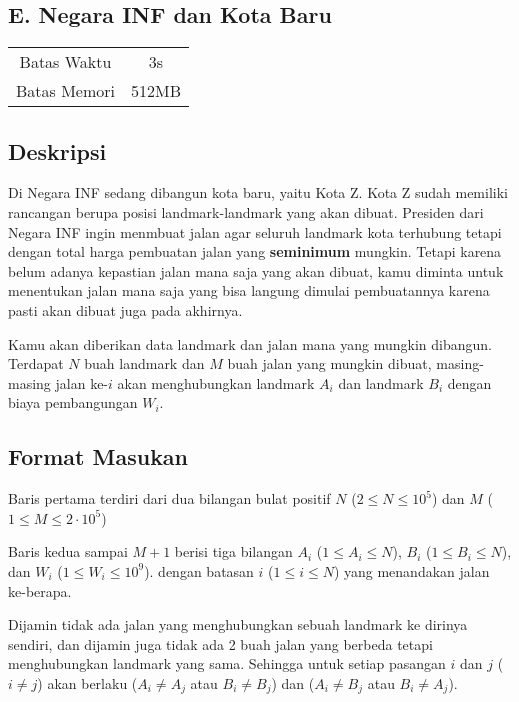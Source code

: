 \documentclass{article}
\begin{document}
\begin{center}
    \section*{E. Negara INF dan Kota Baru} %

    \begin{tabular}{ | c c | }
        \hline
        Batas Waktu  & 3s \\    %
        Batas Memori & 512MB \\  %
        \hline
    \end{tabular}
\end{center}

\subsection*{Deskripsi}

Di Negara INF sedang dibangun kota baru, yaitu Kota Z. Kota Z sudah memiliki rancangan berupa posisi landmark-landmark yang akan dibuat.
Presiden dari Negara INF ingin menmbuat jalan agar seluruh landmark kota terhubung tetapi dengan total harga pembuatan jalan yang \textbf{seminimum} mungkin. Tetapi karena belum adanya kepastian jalan mana saja yang akan dibuat, kamu diminta untuk menentukan jalan mana saja yang bisa langung dimulai pembuatannya karena pasti akan dibuat juga pada akhirnya.

Kamu akan diberikan data landmark dan jalan mana yang mungkin dibangun.
Terdapat $N$ buah landmark dan $M$ buah jalan yang mungkin dibuat, masing-masing jalan ke-$i$ akan menghubungkan landmark $A_i$ dan landmark $B_i$ dengan biaya pembangungan $W_i$.

\subsection*{Format Masukan}

Baris pertama terdiri dari dua bilangan bulat positif $N$ ($2 \leq N \leq 10^5$) dan $M$ ($1 \leq M \leq 2 \cdot 10^5$)

Baris kedua sampai $M + 1$ berisi tiga bilangan $A_i$ ($1 \leq A_i \leq N$), $B_i$ ($1 \leq B_i \leq N$), dan $W_i$ ($1 \leq W_i \leq 10^9$). dengan batasan $i$ ($1 \leq i \leq N$) yang menandakan jalan ke-berapa.

Dijamin tidak ada jalan yang menghubungkan sebuah landmark ke dirinya sendiri, dan dijamin juga tidak ada 2 buah jalan yang berbeda tetapi menghubungkan landmark yang sama. Sehingga untuk setiap pasangan $i$ dan $j$ ($i \neq j$) akan berlaku ($A_i \neq A_j$ atau $B_i \neq B_j$) dan ($A_i \neq B_j$ atau $B_i \neq A_j$).
\end{document}
